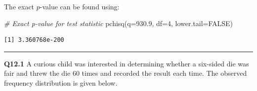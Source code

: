 \documentclass[
  oneside]{krantz}
\newenvironment{Shaded}{\begin{snugshade}}{\end{snugshade}}
\newcommand{\AttributeTok}[1]{\textcolor[rgb]{0.77,0.63,0.00}{#1}}
\newcommand{\CommentTok}[1]{\textcolor[rgb]{0.56,0.35,0.01}{\textit{#1}}}
\newcommand{\ConstantTok}[1]{\textcolor[rgb]{0.00,0.00,0.00}{#1}}
\newcommand{\DecValTok}[1]{\textcolor[rgb]{0.00,0.00,0.81}{#1}}
\newcommand{\FloatTok}[1]{\textcolor[rgb]{0.00,0.00,0.81}{#1}}
\newcommand{\FunctionTok}[1]{\textcolor[rgb]{0.00,0.00,0.00}{#1}}
\newcommand{\NormalTok}[1]{#1}
\begin{document}
The exact \(p\)-value can be found using:

\begin{Shaded}
\begin{Highlighting}[]
\CommentTok{\# Exact p{-}value for test statistic}
\FunctionTok{pchisq}\NormalTok{(}\AttributeTok{q=}\FloatTok{930.9}\NormalTok{, }\AttributeTok{df=}\DecValTok{4}\NormalTok{, }\AttributeTok{lower.tail=}\ConstantTok{FALSE}\NormalTok{)}
\end{Highlighting}
\end{Shaded}

\begin{verbatim}
[1] 3.360768e-200
\end{verbatim}

\begin{center}\rule{0.5\linewidth}{0.5pt}\end{center}

\textbf{Q12.1} A curious child was interested in determining whether a six-sided die was fair and threw the die 60 times and recorded the result each time. The observed frequency distribution is given below.
\end{document}
